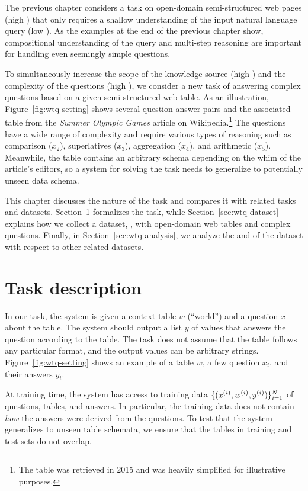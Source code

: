 The previous chapter considers a task on open-domain semi-structured
web pages (high \Breadth) that only requires a shallow
understanding of the input natural language query (low \Depth).
As the examples at the end of the previous chapter
show, compositional understanding of the query
and multi-step reasoning
are important for handling 
even seemingly simple questions.

To simultaneously increase the scope of the knowledge source
(high \Breadth) and the complexity of the questions (high \Depth),
we consider a new task of answering complex questions
based on a given semi-structured web table.
As an illustration,
Figure~\ref{fig:wtq-setting} shows several
question-answer pairs and the associated table
from the \emph{Summer Olympic Games} article on Wikipedia.\footnote{The table was retrieved in 2015
and was heavily simplified for illustrative purposes.}
The questions have a wide range of complexity
and require various types of reasoning such as
comparison ($x_2$), superlatives ($x_3$), 
aggregation ($x_4$), and arithmetic ($x_5$).
Meanwhile, the table contains an arbitrary schema
depending on the whim of the article's editors,
so a system for solving the task needs to generalize
to potentially unseen data schema.

This chapter discusses the nature of the task
and compares it with related tasks and datasets.
Section~\ref{sec:wtq-task} formalizes the task,
while Section~\ref{sec:wtq-dataset} explains how we
collect a dataset, \wtq, with open-domain web tables
and complex questions.
Finally, in Section~\ref{sec:wtq-analysis},
we analyze the \Breadth and \Depth of the dataset
with respect to other related datasets.

\section{Task description}\label{sec:wtq-task}

In our task,
the system is given a context table $w$ (``world'')
and a question $x$ about the table.
The system should
output a list $y$ of values
that answers the question according to the table.
The task does not assume that the table follows
any particular format,
and the output values can be arbitrary strings.
Figure~\ref{fig:wtq-setting} shows an example
of a table $w$, a few question $x_i$, and their answers $y_i$.

At training time, the system has access to training data
$\{(x^{(i)}, w^{(i)}, y^{(i)})\}_{i=1}^N$ of questions, tables, and answers.
In particular, the training data does not contain
\emph{how} the answers were derived from the questions.
To test that the system generalizes to unseen table schemata,
we ensure that the tables in training and test sets
do not overlap.

